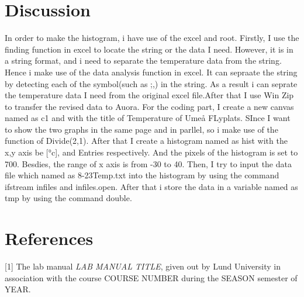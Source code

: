 \documentclass[a4, 12pt]{article}
\begin{document}
\section{Discussion}
In order to make the histogram, i have use of the excel and root. Firstly, I use the finding function in excel to locate the string or the data I need. However, it is in a string format, and i need to separate the temperature data from the string. Hence i make use of the data analysis function in excel. It can sepraate the string by detecting each of the symbol(such as ;,) in the string. As a result i can seprate the temperature data I need from the original excel file.After that I use Win Zip to transfer the revised data to Auora. For the coding part, I create a new canvas named as c1 and with the title of Temperature of Umeå FLyplats. SInce I want to show the two graphs in the same page and in parllel, so i make use of the function of Divide(2,1). After that I create a histogram named as hist with the x,y axis be [°c], and Entries respectively. And the pixels of the histogram is set to 700. Besdies, the range of x axis is from -30 to 40. Then, I try to input the data file which named as 8-23Temp.txt into the histogram by using the command ifstream infiles and infiles.open. After that i store the data in a variable named as tmp by using the command double.
\section{References}
[1] The lab manual \textit{LAB MANUAL TITLE}, given out by Lund University in association with the course COURSE NUMBER during the SEASON semester of YEAR. \newline \newline
\noindent 
\end{document}
